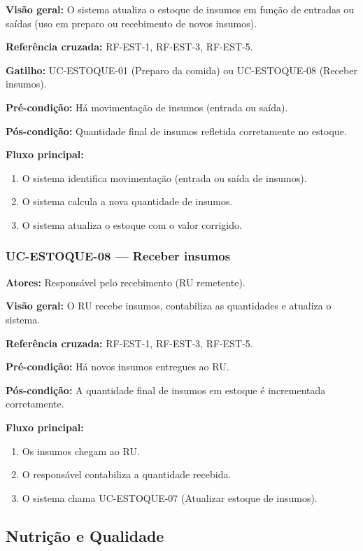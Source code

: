 \documentclass[12pt,a4paper]{article}
\begin{document}
\textbf{Visão geral:} O sistema atualiza o estoque de insumos em função de entradas ou saídas (uso em preparo ou recebimento de novos insumos).  

\textbf{Referência cruzada:} RF-EST-1, RF-EST-3, RF-EST-5.  

\textbf{Gatilho:} UC-ESTOQUE-01 (Preparo da comida) ou UC-ESTOQUE-08 (Receber insumos).  

\textbf{Pré-condição:} Há movimentação de insumos (entrada ou saída).  

\textbf{Pós-condição:} Quantidade final de insumos refletida corretamente no estoque.  

\textbf{Fluxo principal:}
\begin{enumerate}
    \item O sistema identifica movimentação (entrada ou saída de insumos).
    \item O sistema calcula a nova quantidade de insumos.
    \item O sistema atualiza o estoque com o valor corrigido.
\end{enumerate}

\subsubsection{UC-ESTOQUE-08 — Receber insumos}
\textbf{Atores:} Responsável pelo recebimento (RU remetente).  

\textbf{Visão geral:} O RU recebe insumos, contabiliza as quantidades e atualiza o sistema.  

\textbf{Referência cruzada:} RF-EST-1, RF-EST-3, RF-EST-5.  

\textbf{Pré-condição:} Há novos insumos entregues ao RU.  

\textbf{Pós-condição:} A quantidade final de insumos em estoque é incrementada corretamente.  

\textbf{Fluxo principal:}
\begin{enumerate}
    \item Os insumos chegam ao RU.
    \item O responsável contabiliza a quantidade recebida.
    \item O sistema chama UC-ESTOQUE-07 (Atualizar estoque de insumos).
\end{enumerate}

\subsection{Nutrição e Qualidade}
\end{document}
